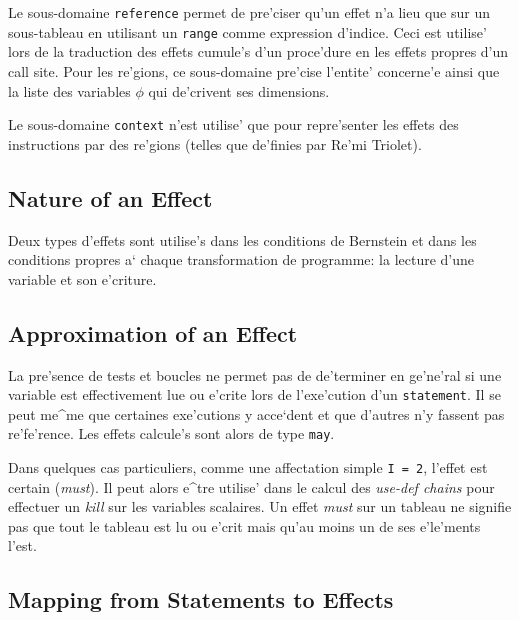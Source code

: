 Le sous-domaine {\tt reference} permet de pre'ciser qu'un effet n'a lieu que
sur un sous-tableau en utilisant un {\tt range} comme expression d'indice.
Ceci est utilise' lors de la traduction des effets cumule's d'un proce'dure
en les effets propres d'un call site. Pour les re'gions, ce sous-domaine
pre'cise l'entite' concerne'e ainsi que la liste des variables $\phi$ qui
de'crivent ses dimensions.

Le sous-domaine {\tt context} n'est utilise' que pour repre'senter les
effets des instructions par des re'gions (telles que de'finies par Re'mi
Triolet).

\subsection{Nature of an Effect}
\label{subsection-action}

{}

Deux types d'effets sont utilise's dans les conditions de Bernstein
et dans les conditions propres a` chaque transformation de programme:
la lecture d'une variable et son e'criture.

\subsection{Approximation of an Effect}
\label{subsection-approximation}

{}

La pre'sence de tests et boucles ne permet pas de de'terminer en ge'ne'ral
si une variable est effectivement lue ou e'crite lors de l'exe'cution
d'un {\tt statement}. Il se peut me^me que certaines exe'cutions
y acce`dent et que d'autres n'y fassent pas re'fe'rence. Les effets
calcule's sont alors de type {\tt may}.

Dans quelques cas particuliers, comme une affectation simple {\tt I = 2},
l'effet est certain ({\em must}). Il peut alors e^tre utilise' dans
le calcul des {\em use-def chains} pour effectuer un {\em kill} sur les
variables scalaires. Un effet {\em must} sur un tableau ne signifie pas
que tout le tableau est lu ou e'crit mais qu'au moins un de ses
e'le'ments l'est.

\subsection{Mapping from Statements to Effects}

